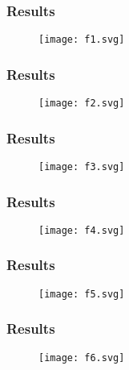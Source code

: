 
\begin{frame}\frametitle{Results}

\begin{figure}
\centering
\texttt{[image: f1.svg]}
\caption{}
\label{}
\end{figure}

\end{frame}

\begin{frame}\frametitle{Results}

\begin{figure}
\centering
\texttt{[image: f2.svg]}
\caption{}
\label{}
\end{figure}

\end{frame}

\begin{frame}\frametitle{Results}

\begin{figure}
\centering
\texttt{[image: f3.svg]}
\caption{}
\label{}
\end{figure}

\end{frame}

\begin{frame}\frametitle{Results}

\begin{figure}
\centering
\texttt{[image: f4.svg]}
\caption{}
\label{}
\end{figure}

\end{frame}

\begin{frame}\frametitle{Results}

\begin{figure}
\centering
\texttt{[image: f5.svg]}
\caption{}
\label{}
\end{figure}

\end{frame}

\begin{frame}\frametitle{Results}

\begin{figure}
\centering
\texttt{[image: f6.svg]}
\caption{}
\label{}
\end{figure}

\end{frame}


